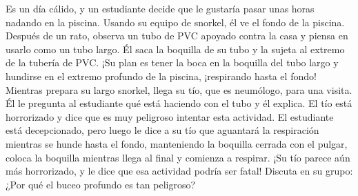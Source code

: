 \item Es un día cálido, y un estudiante decide que le gustaría pasar unas horas nadando en la piscina. Usando su equipo de snorkel, él ve el fondo de la piscina. Después de un rato, observa un tubo de PVC apoyado contra la casa y piensa en usarlo como un tubo largo. Él saca la boquilla de su tubo y la sujeta al extremo de la tubería de PVC. ¡Su plan es tener la boca en la boquilla del tubo largo y hundirse en el extremo profundo de la piscina, ¡respirando hasta el fondo! Mientras prepara su largo snorkel, llega su tío, que es neumólogo, para una visita. Él le pregunta al estudiante qué está haciendo con el tubo y él explica. El tío está horrorizado y dice que es muy peligroso intentar esta actividad. El estudiante está decepcionado, pero luego le dice a su tío que aguantará la respiración mientras se hunde hasta el fondo, manteniendo la boquilla cerrada con el pulgar, coloca la boquilla mientras llega al final y comienza a respirar. ¡Su tío parece aún más horrorizado, y le dice que esa actividad podría ser fatal! Discuta en su grupo: ¿Por qué el buceo profundo es tan peligroso?
